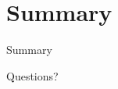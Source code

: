\documentclass{beamer}
\begin{document}
\section*{Summary}
\begin{frame}{Summary}
\end{frame}

\begin{frame}
\begin{center}
Questions?
\end{center}
\end{frame}
\end{document}
